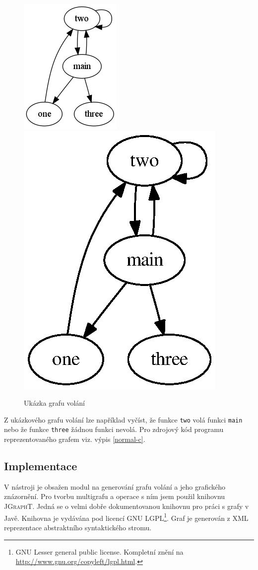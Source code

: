 \documentclass[11pt,final,oneside]{fithesis}
\begin{document}
\begin{figure}[ht]
\begin{center}
\ifpdf
	\includegraphics[scale=0.5]{img/normaln.png}
\else
	\includegraphics{img/normaln.ps}
\fi
\end{center}
\caption{Ukázka grafu volání}
\label{normaln-img}
\end{figure}

Z ukázkového grafu volání lze například vyčíst, že funkce \texttt{two} volá funkci \texttt{main} nebo že funkce \texttt{three} žádnou funkci nevolá. Pro zdrojový kód programu reprezentovaného grafem viz. výpis \ref{normal-c}.

\subsection{Implementace}
V nástroji je obsažen modul na generování grafu volání a jeho grafického znázornění. Pro tvorbu multigrafu a operace s ním jsem použil knihovnu \textsc{JGraphT}\cite{jgrapht}. Jedná se o velmi dobře dokumentovanou knihovnu pro práci s grafy v Javě. Knihovna je vydávána pod licencí \textsc{GNU LGPL}\footnote{GNU Lesser general public license. Kompletní znění na \url{http://www.gnu.org/copyleft/lgpl.html}.}. Graf je generován z XML reprezentace abstraktního syntaktického stromu. 
\end{document}
